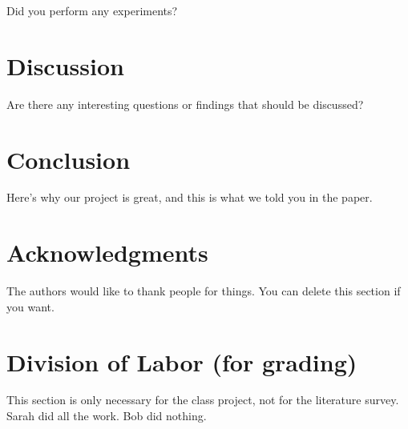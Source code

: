 \documentclass{acm} %
\begin{document}
Did you perform any experiments?

\section{Discussion}

Are there any interesting questions or findings that should be discussed?

\section{Conclusion}

Here's why our project is great, and this is what we told you in the paper.

\section*{Acknowledgments}

The authors would like to thank people for things. You can delete this section
if you want.

\appendix

\section{Division of Labor (for grading)}

This section is only necessary for the class project, not for the literature
survey. Sarah did all the work. Bob did nothing.


\end{document}
